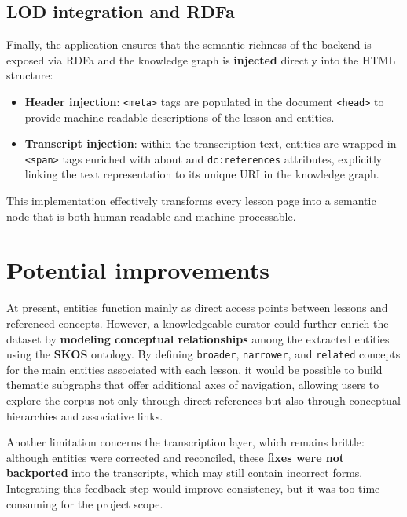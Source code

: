 \documentclass[11pt]{article}
\begin{document}
\subsection{LOD integration and RDFa}
Finally, the application ensures that the semantic richness of the backend is exposed via RDFa and the knowledge graph is \textbf{injected} directly into the HTML structure:

\begin{itemize}
\item \textbf{Header injection}: \texttt{<meta>} tags are populated in the document \texttt{<head>} to provide machine-readable descriptions of the lesson and entities.
\item \textbf{Transcript injection}: within the transcription text, entities are wrapped in \texttt{<span>} tags enriched with about and \texttt{dc:references} attributes, explicitly linking the text representation to its unique URI in the knowledge graph.
\end{itemize}

This implementation effectively transforms every lesson page into a semantic node that is both human-readable and machine-processable.


\section{Potential improvements}
At present, entities function mainly as direct access points between lessons and referenced concepts. However, a knowledgeable curator could further enrich the dataset by \textbf{modeling conceptual relationships} among the extracted entities using the \textbf{SKOS} ontology. By defining \texttt{broader}, \texttt{narrower}, and \texttt{related} concepts for the main entities associated with each lesson, it would be possible to build thematic subgraphs that offer additional axes of navigation, allowing users to explore the corpus not only through direct references but also through conceptual hierarchies and associative links.

Another limitation concerns the transcription layer, which remains brittle: although entities were corrected and reconciled, these \textbf{fixes were not backported} into the transcripts, which may still contain incorrect forms. Integrating this feedback step would improve consistency, but it was too time-consuming for the project scope.
\end{document}
